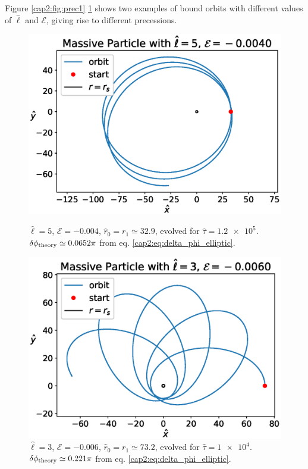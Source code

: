 Figure \ref{cap2:fig:prec1} \ref{cap2:fig:prec2} shows two examples of bound
orbits with different values of $\hat \ell$ and $\mathcal E$, giving rise to
different precessions.

\begin{figure}[h]
    \begin{minipage}{0.48 \textwidth}
        \centering
        \includegraphics[width=\textwidth]{Figures/chapter2/prec1.eps}
        \caption{$\hat \ell = 5$, $\mathcal E = -0.004$,
        $\hat r_0 = r_1 \simeq 32.9$, evolved for $\hat \tau = \num{1.2e5}$. \\
        $\delta \phi_{\rm theory} \simeq 0.0652 \pi$ from eq.
        \ref{cap2:eq:delta_phi_elliptic}.}
        \label{cap2:fig:prec1}
    \end{minipage}
    \hspace{0.015 \textwidth}
    \begin{minipage}{0.48 \textwidth}
        \centering
        \includegraphics[width=\textwidth]{Figures/chapter2/prec2.eps}
        \caption{$\hat \ell = 3$, $\mathcal E = -0.006$,
        $\hat r_0 = r_1 \simeq 73.2$, evolved for $\hat \tau = \num{1e4}$. \\
        $\delta \phi_{\rm theory} \simeq 0.221 \pi$ from eq.
        \ref{cap2:eq:delta_phi_elliptic}.}
        \label{cap2:fig:prec2}
    \end{minipage}
\end{figure}

